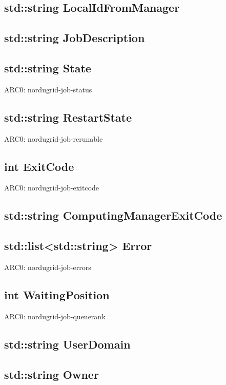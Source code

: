 \documentclass{book}
\begin{document}
\subsection*{std::string LocalIdFromManager}

\subsection*{std::string JobDescription}

\subsection*{std::string State}

ARC0: nordugrid-job-status

\subsection*{std::string RestartState}

ARC0: nordugrid-job-rerunable

\subsection*{int ExitCode}

ARC0: nordugrid-job-exitcode

\subsection*{std::string ComputingManagerExitCode}

\subsection*{std::list<std::string> Error}

ARC0: nordugrid-job-errors

\subsection*{int WaitingPosition}

ARC0: nordugrid-job-queuerank

\subsection*{std::string UserDomain}

\subsection*{std::string Owner}
\end{document}
